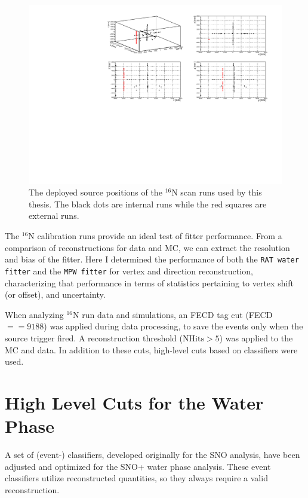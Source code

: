 \begin{figure}[!htb]
	\centering
	\includegraphics[width=15cm]{N16_3Dscan.pdf}
	\caption[The deployed source positions of the $^{16}$N scan runs.]{The deployed source positions of the $^{16}$N scan runs used by this thesis. The black dots are internal runs while the red squares are external runs.	\label{N16_3Dscan}}
\end{figure}

The $^{16}$N calibration runs provide an ideal test of fitter performance. From a comparison of reconstructions for data and MC, we can extract the resolution and bias of the fitter. Here I determined the performance of both the \texttt{RAT water fitter} and the \texttt{MPW fitter} for vertex and direction reconstruction, characterizing that performance in terms of statistics pertaining to vertex shift (or offset), and uncertainty. 

When analyzing $^{16}$N run data and simulations, an FECD tag cut (FECD$==9188$) was applied during data processing, to save the events only when the source trigger fired. A reconstruction threshold ($\mathrm{NHits}>5$) was applied to the MC and data. In addition to these cuts, high-level cuts based on classifiers were used. 

\section{High Level Cuts for the Water Phase}\label{sect:high_level_cuts}

A set of (event-) classifiers, developed originally for the SNO analysis, have been adjusted and optimized for the SNO+ water phase analysis\cite{highlevel}. These event classifiers utilize reconstructed quantities, so they always require a valid reconstruction.

